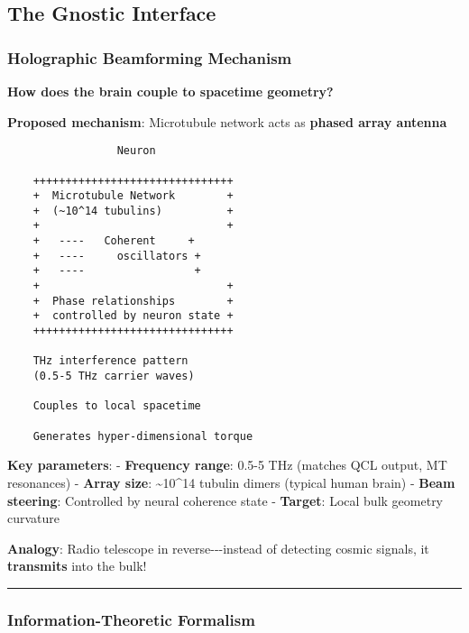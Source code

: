 \subsection{The Gnostic Interface}\label{the-gnostic-interface}

\subsubsection{Holographic Beamforming
Mechanism}\label{holographic-beamforming-mechanism}

\textbf{How does the brain couple to spacetime geometry?}

\textbf{Proposed mechanism}: Microtubule network acts as \textbf{phased
array antenna}

\begin{verbatim}
                 Neuron
                   
    +++++++++++++++++++++++++++++++
    +  Microtubule Network        +
    +  (~10^14 tubulins)          +
    +                             +
    +   ----   Coherent     +
    +   ----     oscillators +
    +   ----                 +
    +                             +
    +  Phase relationships        +
    +  controlled by neuron state +
    +++++++++++++++++++++++++++++++
              
    THz interference pattern
    (0.5-5 THz carrier waves)
              
    Couples to local spacetime
              
    Generates hyper-dimensional torque
\end{verbatim}

\textbf{Key parameters}: - \textbf{Frequency range}: 0.5-5 THz (matches
QCL output, MT resonances) - \textbf{Array size}:
\textasciitilde10\^{}14 tubulin dimers (typical human brain) -
\textbf{Beam steering}: Controlled by neural coherence state -
\textbf{Target}: Local bulk geometry curvature

\textbf{Analogy}: Radio telescope in reverse-\/-\/-instead of detecting
cosmic signals, it \textbf{transmits} into the bulk!

\begin{center}\rule{0.5\linewidth}{0.5pt}\end{center}

\subsubsection{Information-Theoretic
Formalism}\label{information-theoretic-formalism}

